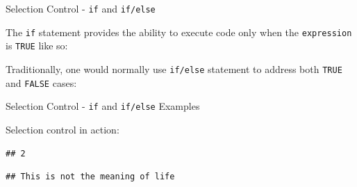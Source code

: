 \begin{frame}[fragile]{Selection Control - \texttt{if} and
\texttt{if/else}}

The \texttt{if} statement provides the ability to execute code only when
the \texttt{expression} is \texttt{TRUE} like so:

\begin{Shaded}
\begin{Highlighting}[]
\NormalTok{\}}
\end{Highlighting}
\end{Shaded}

Traditionally, one would normally use \texttt{if/else} statement to
address both \texttt{TRUE} and \texttt{FALSE} cases:

\begin{Shaded}
\begin{Highlighting}[]
\NormalTok{\}}
\end{Highlighting}
\end{Shaded}

\end{frame}

\begin{frame}[fragile]{Selection Control - \texttt{if} and
\texttt{if/else} Examples}

Selection control in action:

\begin{Shaded}
\begin{Highlighting}[]
\StringTok{ }
\StringTok{ }\NormalTok{)\{   }
  \NormalTok{) }
\NormalTok{\}}
\end{Highlighting}
\end{Shaded}

\begin{verbatim}
## 2
\end{verbatim}

\begin{Shaded}
\begin{Highlighting}[]
\StringTok{ }\NormalTok{)\{    }
  \NormalTok{(}\NormalTok{) }
  \StringTok{ }
  \NormalTok{(}\NormalTok{) }
\NormalTok{\}}
\end{Highlighting}
\end{Shaded}

\begin{verbatim}
## This is not the meaning of life
\end{verbatim}

\end{frame}

